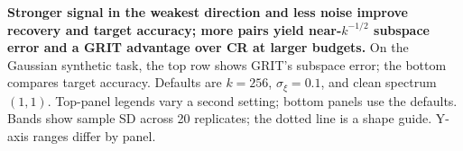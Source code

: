 \textbf{Stronger signal in the weakest direction and less noise improve recovery and target accuracy; more pairs yield near-$k^{-1/2}$ subspace error and a GRIT advantage over CR at larger budgets.} On the Gaussian synthetic task, the top row shows GRIT's subspace error; the bottom compares target accuracy. Defaults are $k=256$, $\sigma_\xi=0.1$, and clean spectrum $(1,1)$. Top-panel legends vary a second setting; bottom panels use the defaults. Bands show sample SD across 20 replicates; the dotted line is a shape guide. Y-axis ranges differ by panel.
